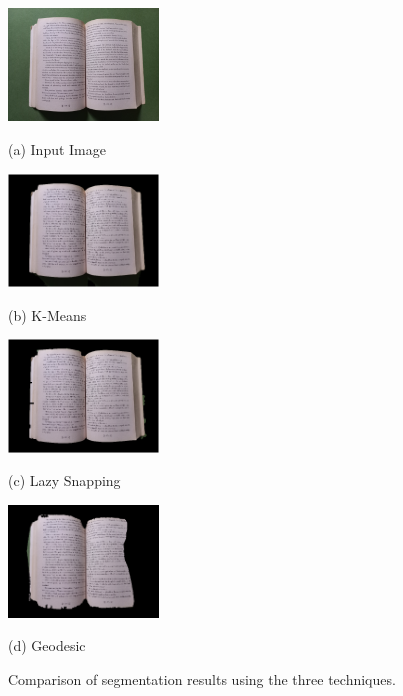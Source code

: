 \documentclass{article}
\begin{document}
\begin{figure}[H]
  \begin{minipage}[b]{.48\linewidth}
    \centering
    \centerline{\includegraphics[width=4.0cm]{Figures/open_book.jpg}}
    \centerline{(a) Input Image}\medskip
  \end{minipage}
  \hfill
  \begin{minipage}[b]{.48\linewidth}
    \centering
    \centerline{\includegraphics[width=4.0cm]{Figures/openbook_kmeans_result.png}}
    \centerline{(b) K-Means}\medskip
  \end{minipage}
  \hfill
  \begin{minipage}[b]{0.48\linewidth}
    \centering
    \centerline{\includegraphics[width=4.0cm]{Figures/openbook_lazysnapping_result.png}}
    \centerline{(c) Lazy Snapping}\medskip
  \end{minipage}
  \hfill
  \begin{minipage}[b]{0.48\linewidth}
    \centering
    \centerline{\includegraphics[width=4.0cm]{Figures/openbook_geodesic_result.png}}
    \centerline{(d) Geodesic}\medskip
  \end{minipage}
  \caption{Comparison of segmentation results using the three techniques.}
  \label{segmentation_res}
\end{figure}
\end{document}
